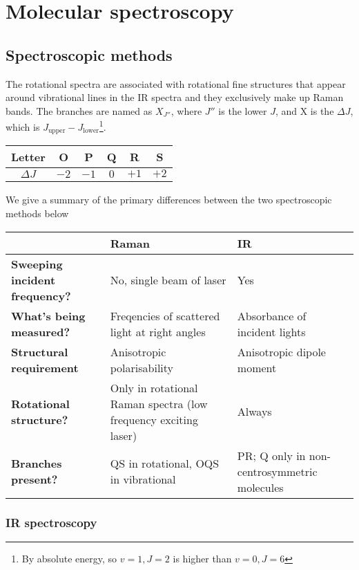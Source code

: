 \section{Molecular spectroscopy}
\label{sec_spec}


\subsection{Spectroscopic methods}
The rotational spectra are associated with rotational fine structures that appear around vibrational lines in the IR spectra and they exclusively make up Raman bands.
The branches are named as $X_{J''}$, where $J''$ is the lower $J$, and X is the $\Delta J$, which is $J_{\mathrm{upper}}-J_{\mathrm{lower}} $\footnote{By absolute energy, so $v=1,J=2$ is higher than $v=0,J=6$}.
\begin{center}
	\begin{tabular}{c|ccccc}
	Letter & O & P & Q & R & S\\
	\hline
	$\Delta J$ & $-2$ & $-1$ & $0$ & $+1$ & $+2$
	\end{tabular}
\end{center}
We give a summary of the primary differences between the two spectroscopic methods below
\begin{center}
	\begin{tabular}{|p{5cm}|p{4.5cm}|p{4.5cm}|}
	 \hline
	 & \textbf{Raman} & \textbf{IR}\\
	 \hline
	 \textbf{Sweeping incident frequency?} & No, single beam of laser & Yes\\
	 \hline
	 \textbf{What's being measured?} & Freqencies of scattered light at right angles & Absorbance of incident lights \\
	 \hline
	 \textbf{Structural requirement} & Anisotropic polarisability & Anisotropic dipole moment\\
	 \hline
	 \textbf{Rotational structure?} & Only in rotational Raman spectra (low frequency exciting laser) & Always\\
	 \hline
	 \textbf{Branches present?} & QS in rotational, OQS in vibrational & PR; Q only in non-centrosymmetric molecules\\
	 \hline
	\end{tabular}
\end{center}
\subsubsection{IR spectroscopy}

